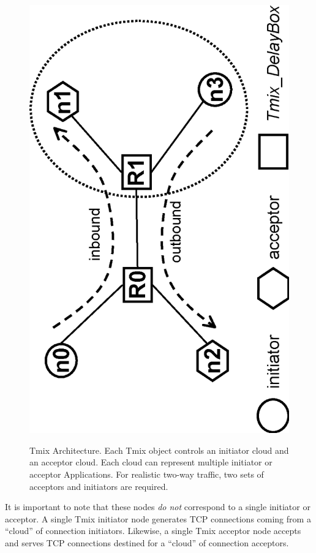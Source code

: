 \begin{figure}
\centering
\includegraphics[scale=0.5, angle=270, clip]{figures/tmix-fig.eps}
\label{fig:tmix}
\caption{Tmix Architecture. Each Tmix object controls
an initiator cloud and an acceptor cloud.  Each cloud can represent
multiple initiator or acceptor Applications.  For realistic two-way
traffic, two sets of acceptors and initiators are required.}
\end{figure}  
It is important to note that these nodes \emph{do not} correspond to a
single initiator or acceptor. A single Tmix initiator node generates
TCP connections coming from a ``cloud'' of connection initiators.
Likewise, a single Tmix acceptor node accepts and serves TCP
connections destined for a ``cloud'' of connection acceptors. 


